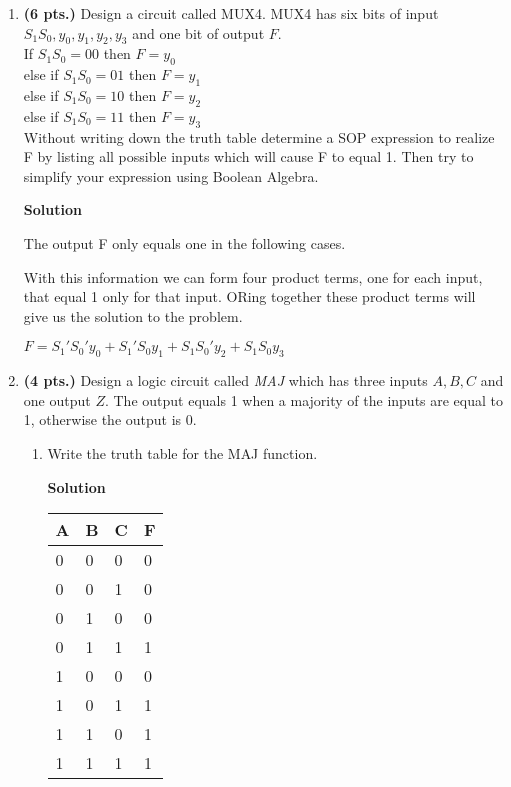 \begin{enumerate}
\item \textbf{ (6 pts.)} Design a circuit called MUX4.  MUX4 has six bits of input 
$S_1 S_0, y_0, y_1, y_2, y_3$ and one bit of output $F$.  \\
If      $S_1 S_0 = 00$ then $F=y_0$  \\
else if $S_1 S_0 = 01$ then $F=y_1$ \\
else if $S_1 S_0 = 10$ then $F=y_2$ \\
else if $S_1 S_0 = 11$ then $F=y_3$ \\
Without writing down the truth table determine a SOP expression
to realize F by listing all possible inputs which will cause F to equal 1.
Then try to simplify your expression using Boolean Algebra.

\begin{onlysolution}  \textbf{Solution} \itshape

The output F only equals one in the following cases.

With this information we can form four product terms, one for each input, 
that equal 1 only for that input.  ORing together these product terms 
will give us the solution to the problem.

$F = S_1'S_0'y_0 + S_1'S_0 y_1 + S_1 S_0'y_2 + S_1 S_0 y_3$
\end{onlysolution}

\item  \textbf{ (4 pts.)} Design a logic circuit called \textit{MAJ} which 
has three inputs $A,B,C$ and one output $Z$. The output equals 1 
when a majority of the inputs are equal to 1, otherwise the output is 0.
\begin{enumerate}
	\item Write the truth table for the MAJ function.

\begin{onlysolution}  \textbf{Solution} \itshape

	\begin{tabular}{l|l|l||l} \\ 
	A & B & C &  F \\ \hline
	0 & 0 & 0 &  0 \\ \hline
	0 & 0 & 1 &  0 \\ \hline
	0 & 1 & 0 &  0 \\ \hline
	0 & 1 & 1 &  1 \\ \hline
	1 & 0 & 0 &  0 \\ \hline
	1 & 0 & 1 &  1 \\ \hline
	1 & 1 & 0 &  1 \\ \hline
	1 & 1 & 1 &  1 \\ 
	\end{tabular}
\end{onlysolution}


\end{enumerate}
\end{enumerate}
